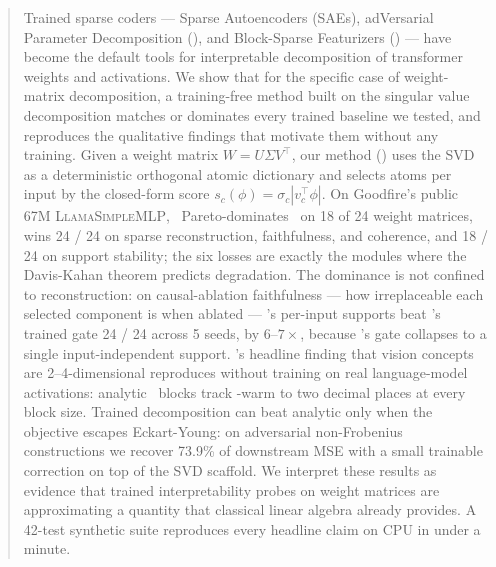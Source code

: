 \begin{abstract}
Trained sparse coders --- Sparse Autoencoders (SAEs), adVersarial Parameter Decomposition (\vpd), and Block-Sparse Featurizers (\bsf) --- have become the default tools for interpretable decomposition of transformer weights and activations. We show that for the specific case of weight-matrix decomposition, a training-free method built on the singular value decomposition matches or dominates every trained baseline we tested, and reproduces the qualitative findings that motivate them without any training. Given a weight matrix $W = U\Sigma V^\top$, our method (\svdomp) uses the SVD as a deterministic orthogonal atomic dictionary and selects atoms per input by the closed-form score $s_c(\phi) = \sigma_c |v_c^\top \phi|$. On Goodfire's public 67M \textsc{LlamaSimpleMLP}, \svdomp\ Pareto-dominates \vpd\ on 18 of 24 weight matrices, wins 24 / 24 on sparse reconstruction, faithfulness, and coherence, and 18 / 24 on support stability; the six losses are exactly the modules where the Davis-Kahan theorem predicts degradation. The dominance is not confined to reconstruction: on causal-ablation faithfulness --- how irreplaceable each selected component is when ablated --- \svdomp's per-input supports beat \vpd's trained gate 24 / 24 across 5 seeds, by $6$--$7\times$, because \vpd's gate collapses to a single input-independent support. \bsf's headline finding that vision concepts are 2--4-dimensional reproduces without training on real language-model activations: analytic \svdomp\ blocks track \bsf-warm to two decimal places at every block size. Trained decomposition can beat analytic only when the objective escapes Eckart-Young: on adversarial non-Frobenius constructions we recover 73.9\% of downstream MSE with a small trainable correction on top of the SVD scaffold. We interpret these results as evidence that trained interpretability probes on weight matrices are approximating a quantity that classical linear algebra already provides. A 42-test synthetic suite reproduces every headline claim on CPU in under a minute.
\end{abstract}
